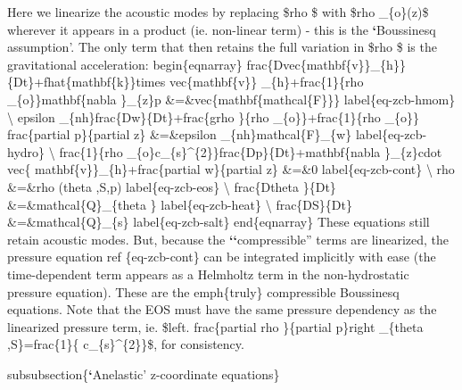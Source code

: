 \documentclass[letterpaper,10pt,english]{sphinxmanual}
\begin{document}
Here we linearize the acoustic modes by replacing \$rho \$ with \$rho \_\{o\}(z)\$
wherever it appears in a product (ie. non-linear term) - this is the
{\color{red}\bfseries{}{}`}Boussinesq assumption'. The only term that then retains the full variation
in \$rho \$ is the gravitational acceleration:
begin\{eqnarray\}
frac\{Dvec\{mathbf\{v\}\}\_\{h\}\}\{Dt\}+fhat\{mathbf\{k\}\}times vec\{mathbf\{v\}\}
\_\{h\}+frac\{1\}\{rho \_\{o\}\}mathbf\{nabla \}\_\{z\}p \&=\&vec\{mathbf\{mathcal\{F\}\}\}
label\{eq-zcb-hmom\} \textbackslash{}
epsilon \_\{nh\}frac\{Dw\}\{Dt\}+frac\{grho \}\{rho \_\{o\}\}+frac\{1\}\{rho \_\{o\}\}
frac\{partial p\}\{partial z\} \&=\&epsilon \_\{nh\}mathcal\{F\}\_\{w\}
label\{eq-zcb-hydro\} \textbackslash{}
frac\{1\}\{rho \_\{o\}c\_\{s\}\textasciicircum{}\{2\}\}frac\{Dp\}\{Dt\}+mathbf\{nabla \}\_\{z\}cdot vec\{
mathbf\{v\}\}\_\{h\}+frac\{partial w\}\{partial z\} \&=\&0  label\{eq-zcb-cont\} \textbackslash{}
rho \&=\&rho (theta ,S,p)  label\{eq-zcb-eos\} \textbackslash{}
frac\{Dtheta \}\{Dt\} \&=\&mathcal\{Q\}\_\{theta \}  label\{eq-zcb-heat\} \textbackslash{}
frac\{DS\}\{Dt\} \&=\&mathcal\{Q\}\_\{s\}  label\{eq-zcb-salt\}
end\{eqnarray\}
These equations still retain acoustic modes. But, because the
{\color{red}\bfseries{}{}`{}`}compressible'' terms are linearized, the pressure equation ref
\{eq-zcb-cont\} can be integrated implicitly with ease (the time-dependent
term appears as a Helmholtz term in the non-hydrostatic pressure equation).
These are the emph\{truly\} compressible Boussinesq equations. Note that the
EOS must have the same pressure dependency as the linearized pressure term,
ie. \$left. frac\{partial rho \}\{partial p\}right\textbar{} \_\{theta ,S\}=frac\{1\}\{
c\_\{s\}\textasciicircum{}\{2\}\}\$, for consistency.

subsubsection\{{\color{red}\bfseries{}{}`}Anelastic' z-coordinate equations\}
\end{document}
